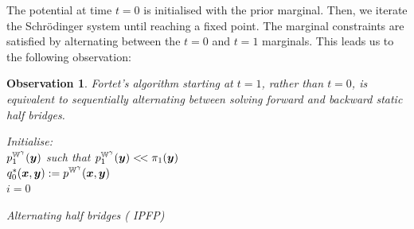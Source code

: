 \documentclass[a4paper,12pt,twoside,openright]{report}
\newtheorem{observation}{Observation}
\theoremstyle{definition}
\begin{document}
 The potential at time $t=0$ is initialised with the prior marginal. Then, we iterate the Schrödinger system until reaching a fixed point.  The marginal constraints are satisfied by alternating between the $t=0$ and $t=1$ marginals. This leads us to the following observation:
\begin{observation}\label{obs:forkek}
Fortet's algorithm starting at $t=1$, rather than $t=0$, is equivalent to sequentially alternating between solving forward and backward static half bridges.
\begin{algorithm} \label{alg:ipfp_intro}
Initialise:\\
$p^{\mathbb{W}^{\gamma}}_1({\bm{y}})$ such that $p^{\mathbb{W}^{\gamma}}_1({\bm{y}}) <\!< \pi_1({\bm{y}})$ \\
$ q^{*}_{0}({\bm{x}},{\bm{y}}) :=p^{\mathbb{W}^{\gamma}}({\bm{x}},{\bm{y}})$\\
$i=0$ \\
\caption{Alternating half bridges (\cite{kullback1968probability} IPFP) }
\end{algorithm}
\end{observation}
\end{document}
